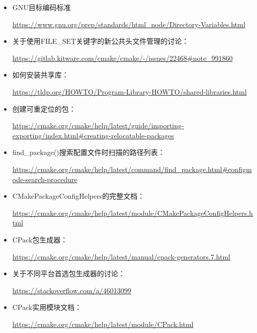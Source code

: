 

\begin{itemize}
\item
GNU目标编码标准

\url{https://www.gnu.org/prep/standards/html_node/Directory-Variables.html}

\item
关于使用FILE\_SET关键字的新公共头文件管理的讨论：

\url{https://gitlab.kitware.com/cmake/cmake/-/issues/22468#note_991860}

\item
如何安装共享库：

\url{https://tldp.org/HOWTO/Program-Library-HOWTO/shared-libraries.html}

\item
创建可重定位的包：

\url{https://cmake.org/cmake/help/latest/guide/importing-exporting/index.html#creating-relocatable-packages}

\item
find\_package()搜索配置文件时扫描的路径列表：

\url{https://cmake.org/cmake/help/latest/command/find_package.html#configmode-search-procedure}

\item
CMakePackageConfigHelpers的完整文档：

\url{https://cmake.org/cmake/help/latest/module/CMakePackageConfigHelpers.html}

\item
CPack包生成器：

\url{https://cmake.org/cmake/help/latest/manual/cpack-generators.7.html}

\item
关于不同平台首选包生成器的讨论：

\url{https://stackoverflow.com/a/46013099}

\item
CPack实用模块文档：

\url{https://cmake.org/cmake/help/latest/module/CPack.html}
\end{itemize}